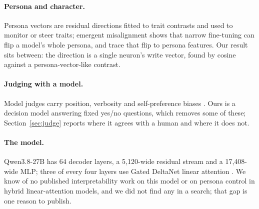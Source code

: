 \paragraph{Persona and character.} Persona vectors \citep{chen2025persona} are residual directions fitted to
trait contrasts and used to monitor or steer traits; emergent misalignment \citep{betley2025emergent} shows
that narrow fine-tuning can flip a model's whole persona, and \citet{wang2025persona} trace that flip to
persona features. Our result sits between: the direction is a single neuron's write vector, found by cosine
against a persona-vector-like contrast.

\paragraph{Judging with a model.} Model judges carry position, verbosity and self-preference biases
\citep{zheng2023judging}. Ours is a decision model answering fixed yes/no questions, which removes some of
these; Section~\ref{sec:judge} reports where it agrees with a human and where it does not.

\paragraph{The model.} Qwen3.8-27B has 64 decoder layers, a 5{,}120-wide residual stream and a 17{,}408-wide
MLP; three of every four layers use Gated DeltaNet linear attention \citep{qwen2026qwen38,yang2024gated}. We
know of no published interpretability work on this model or on persona control in hybrid linear-attention
models, and we did not find any in a search; that gap is one reason to publish.

